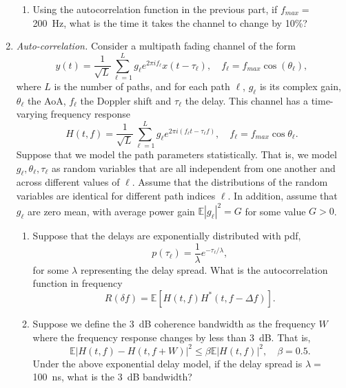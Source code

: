 \documentclass[11pt]{article}
\def\beq{\begin{equation}}
\def\eeq{\end{equation}}
\def\Exp{\mathbb{E}}
\begin{document}
\begin{enumerate}
\begin{enumerate}[label=(\alph*)]
\item Using the autocorrelation function in the previous part,
if $f_{max} = $ \SI{200}{Hz},
what is the time it takes the channel to change by 10\%?
\end{enumerate}

\item \emph{Auto-correlation.}  Consider a multipath fading channel of the form
\[
    y(t) = \frac{1}{\sqrt{L}}\sum_{\ell = 1}^L g_\ell
        e^{2\pi if_\ell} x(t-\tau_\ell), \quad f_\ell = f_{max}\cos(\theta_\ell),
\]
where $L$ is the number of paths, and for each path $\ell$,
$g_\ell$ is its complex gain, $\theta_\ell$ the AoA, $f_\ell$ the Doppler shift
and $\tau_\ell$ the delay.  This channel has a time-varying frequency response
\beq \label{eq:Htf}
    H(t,f) = \frac{1}{\sqrt{L}}
    \sum_{\ell =1}^L g_\ell e^{2\pi  i(f_\ell t - \tau_\ell f)},
    \quad f_\ell = f_{max}\cos\theta_\ell.
\eeq
Suppose that we model the path parameters statistically.  That is,
we model $g_\ell,\theta_\ell,\tau_\ell$ as random variables that
are all independent
from one another and across different values of $\ell$.  Assume that the
distributions of the random variables are identical for different
path indices $\ell$.
In addition, assume that
$g_\ell$ are zero mean, with average power gain
$\Exp|g_\ell|^2 = G$ for some value $G > 0$.

\begin{enumerate}[label=(\alph*)]
\item Suppose that the delays are exponentially distributed with pdf,
\[
    p(\tau_\ell) = \frac{1}{\lambda}e^{-\tau_\ell/\lambda},
\]
for some $\lambda$ representing the delay spread.
What is the autocorrelation function in frequency
\[
    R(\delta f) = \Exp\left[ H(t,f)H^*(t,f-\Delta f) \right].
\]

\item Suppose we define the \SI{3}{dB} coherence bandwidth as the frequency $W$
where the frequency response changes by less than 3~dB.  That is,
\[
    \Exp|H(t,f)-H(t,f+W)|^2 \leq \beta \Exp|H(t,f)|^2, \quad \beta = 0.5.
\]
Under the above exponential delay model,
if the delay spread is $\lambda =$ \SI{100}{ns}, what is the \SI{3}{dB} bandwidth?
\end{enumerate}
%
%
%

\end{enumerate}
\end{document}
